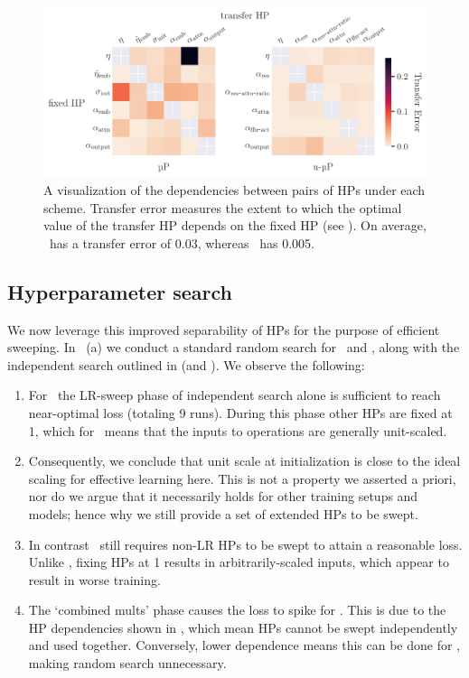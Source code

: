 \begin{figure}[t]
    \vspace{-1em}
    \centering
    \includegraphics[width=\textwidth]{arXiv/figures/hp_pair_dependencies_val.pdf}
    \caption{A visualization of the dependencies between pairs of HPs under each scheme. Transfer error measures the extent to which the optimal value of the transfer HP depends on the fixed HP (see ). On average, \mup\ has a transfer error of 0.03, whereas \umup\ has 0.005.}
    \label{fig:experiments:transfer_error}
\end{figure}

\subsection{Hyperparameter search} We now leverage this improved separability of HPs for the purpose of efficient sweeping. In ~(a) we conduct a standard random search for \mup\ and \umup, along with the independent search outlined in  (and ). We observe the following:

\begin{enumerate}
    \item For \umup\ the LR-sweep phase of independent search alone is sufficient to reach near-optimal loss (totaling 9 runs). During this phase other HPs are fixed at 1, which for \umup\ means that the inputs to operations are generally unit-scaled.

    \item Consequently, we conclude that unit scale at initialization is close to the ideal scaling for effective learning here. This is not a property we asserted a priori, nor do we argue that it necessarily holds for other training setups and models; hence why we still provide a set of extended HPs to be swept.

    \item In contrast \mup\ still requires non-LR HPs to be swept to attain a reasonable loss. Unlike \umup, fixing HPs at 1 results in arbitrarily-scaled inputs, which appear to result in worse training.

    \item The `combined mults' phase causes the loss to spike for \mup. This is due to the HP dependencies shown in , which mean HPs cannot be swept independently and used together. Conversely, lower dependence means this can be done for \umup, making random search unnecessary.
\end{enumerate}

